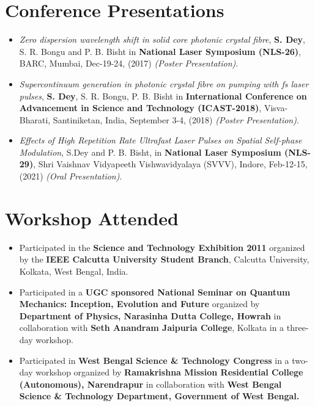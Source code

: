 \documentclass[11pt,a4paper,sans]{moderncv}        %
\begin{document}
\section{Conference Presentations}
\begin{itemize}
	\item{\emph{Zero dispersion wavelength shift in solid core photonic crystal fibre}, \textbf{S. Dey}, S. R. Bongu and P. B. Bisht in \textbf{National Laser Symposium (NLS-26)}, BARC, Mumbai, Dec-19-24, (2017) \emph{(Poster Presentation)}.}
	
	\vspace{6pt}
	
	\item{\emph{Supercontinuum generation in photonic crystal fibre on pumping with fs laser pulses}, \textbf{S. Dey}, S. R. Bongu, P. B. Bisht in \textbf{International Conference on Advancement in Science and Technology (ICAST-2018)}, Visva-Bharati, Santiniketan, India, September 3-4, (2018) \emph{(Poster Presentation)}.}
	
	\vspace{6pt}
	
	\item{\emph{Effects of High Repetition Rate Ultrafast Laser Pulses on Spatial Self-phase Modulation}, S.Dey and  P. B. Bisht, in \textbf{National Laser Symposium (NLS-29)}, Shri Vaishnav Vidyapeeth Vishwavidyalaya (SVVV), Indore, Feb-12-15, (2021) \emph{(Oral Presentation)}.}
\end{itemize}


\section{Workshop Attended}

\begin{itemize}
	\item{Participated in the \textbf{Science and Technology Exhibition 2011} organized by the \textbf{IEEE Calcutta University
		Student Branch}, Calcutta University, Kolkata, West Bengal, India.}
	
	\vspace{3pt}
	
	\item{Participated in a \textbf{UGC sponsored National Seminar on Quantum Mechanics: Inception, Evolution and Future} organized by \textbf{Department of Physics, Narasinha Dutta College, Howrah} in collaboration with \textbf{Seth Anandram Jaipuria College}, Kolkata in a three-day workshop.}
	
	\vspace{3pt}
	
	\item{Participated in\textbf{ West Bengal Science \& Technology Congress} in a two-day workshop organized by \textbf{Ramakrishna Mission Residential College (Autonomous), Narendrapur} in collaboration with \textbf{West Bengal Science \& Technology Department, Government of West Bengal.}}
	
\end{itemize}
\end{document}
